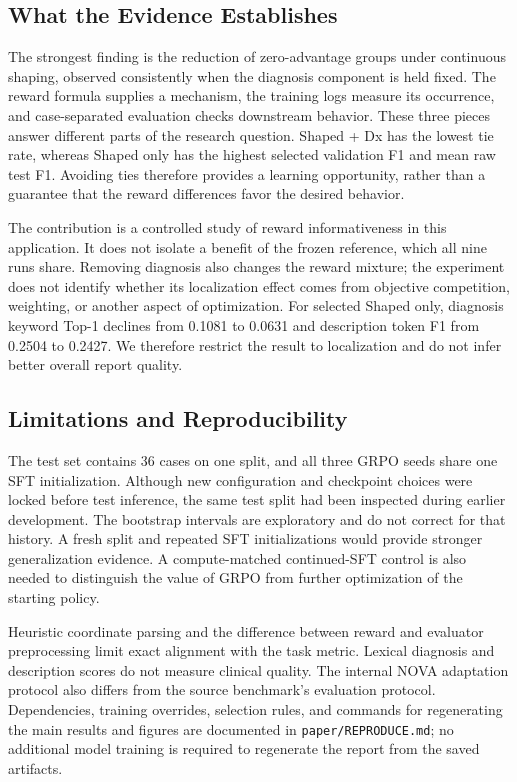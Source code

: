 \documentclass[conference]{IEEEtran}
\begin{document}
\subsection{What the Evidence Establishes}
The strongest finding is the reduction of zero-advantage groups under continuous shaping, observed consistently when the diagnosis component is held fixed. The reward formula supplies a mechanism, the training logs measure its occurrence, and case-separated evaluation checks downstream behavior. These three pieces answer different parts of the research question. Shaped + Dx has the lowest tie rate, whereas Shaped only has the highest selected validation F1 and mean raw test F1. Avoiding ties therefore provides a learning opportunity, rather than a guarantee that the reward differences favor the desired behavior.

The contribution is a controlled study of reward informativeness in this application. It does not isolate a benefit of the frozen reference, which all nine runs share. Removing diagnosis also changes the reward mixture; the experiment does not identify whether its localization effect comes from objective competition, weighting, or another aspect of optimization. For selected Shaped only, diagnosis keyword Top-1 declines from 0.1081 to 0.0631 and description token F1 from 0.2504 to 0.2427. We therefore restrict the result to localization and do not infer better overall report quality.

\subsection{Limitations and Reproducibility}
The test set contains 36 cases on one split, and all three GRPO seeds share one SFT initialization. Although new configuration and checkpoint choices were locked before test inference, the same test split had been inspected during earlier development. The bootstrap intervals are exploratory and do not correct for that history. A fresh split and repeated SFT initializations would provide stronger generalization evidence. A compute-matched continued-SFT control is also needed to distinguish the value of GRPO from further optimization of the starting policy.

Heuristic coordinate parsing and the difference between reward and evaluator preprocessing limit exact alignment with the task metric. Lexical diagnosis and description scores do not measure clinical quality. The internal NOVA adaptation protocol also differs from the source benchmark's evaluation protocol. Dependencies, training overrides, selection rules, and commands for regenerating the main results and figures are documented in \texttt{paper/REPRODUCE.md}; no additional model training is required to regenerate the report from the saved artifacts.
\end{document}
